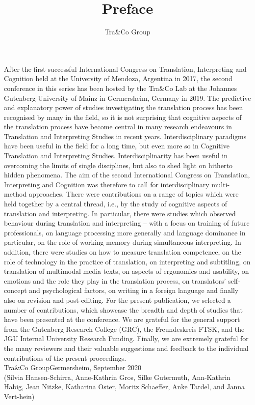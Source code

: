 \documentclass[output=paper]{langsci/langscibook}
\title{Preface}
\author{{Tra\&Co Group}\affiliation{Johannes Gutenberg University Mainz}}
\begin{document}
\maketitle

\noindent After the first successful International Congress on Translation, Interpreting and Cognition held at the University of Mendoza, Argentina in 2017, the second conference in this series has been hosted by the Tra\&Co Lab at the Johannes Gutenberg University of Mainz in Germersheim, Germany in 2019. The predictive and explanatory power of studies investigating the translation process has been recognised by many in the field, so it is not surprising that cognitive aspects of the translation process have become central in many research endeavours in Translation and Interpreting Studies in recent years. Interdisciplinary paradigms have been useful in the field for a long time, but even more so in Cognitive Translation and Interpreting Studies. Interdisciplinarity has been useful in overcoming the limits of single disciplines, but also to shed light on hitherto hidden phenomena. The aim of the second International Congress on Translation, Interpreting and Cognition was therefore to call for interdisciplinary multi-method approaches. There were contributions on a range of topics which were held together by a central thread, i.e., by the study of cognitive aspects of translation and interpreting. In particular, there were studies which observed behaviour during translation and interpreting – with a focus on training of future professionals, on language processing more generally and language dominance in particular, on the role of working memory during simultaneous interpreting. In addition, there were studies on how to measure translation competence, on the role of technology in the practice of translation, on interpreting and subtitling, on translation of multimodal media texts, on aspects of ergonomics and usability, on emotions and the role they play in the translation process, on translators' self-concept and psychological factors, on writing in a foreign language and finally also on revision and post-editing. For the present publication, we selected a number of contributions, which showcase the breadth and depth of studies that have been presented at the conference. We are grateful for the general support from the Gutenberg Research College (GRC), the Freundeskreis FTSK, and the JGU Internal University Research Funding. Finally, we are extremely grateful for the many reviewers and their valuable suggestions and feedback to the individual contributions of the present proceedings.\bigskip\\

\noindent Tra\&Co Group\hfill Germersheim, September 2020\\
\noindent
(Silvia Hansen-Schirra, Anne-Kathrin Gros, Silke Gutermuth, Ann-Kathrin Habig, Jean Nitzke, Katharina Oster, Moritz Schaeffer, Anke Tardel, and Janna Vert-hein)
\end{document}
